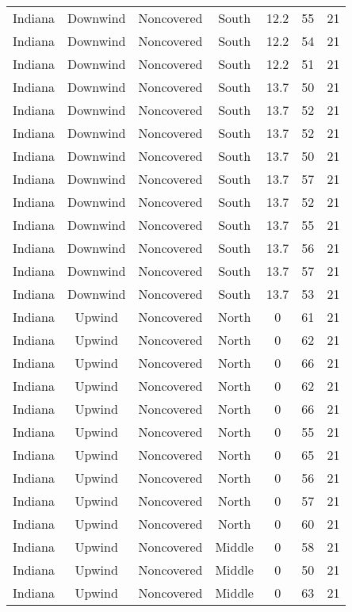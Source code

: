\documentclass{article}
\begin{document}
\begin{longtable}[H]{ccccccc}
Indiana & Downwind & Noncovered & South  & 12.2 & 55 & 21 \\
Indiana & Downwind & Noncovered & South  & 12.2 & 54 & 21 \\
Indiana & Downwind & Noncovered & South  & 12.2 & 51 & 21 \\
Indiana & Downwind & Noncovered & South  & 13.7 & 50 & 21 \\
Indiana & Downwind & Noncovered & South  & 13.7 & 52 & 21 \\
Indiana & Downwind & Noncovered & South  & 13.7 & 52 & 21 \\
Indiana & Downwind & Noncovered & South  & 13.7 & 50 & 21 \\
Indiana & Downwind & Noncovered & South  & 13.7 & 57 & 21 \\
Indiana & Downwind & Noncovered & South  & 13.7 & 52 & 21 \\
Indiana & Downwind & Noncovered & South  & 13.7 & 55 & 21 \\
Indiana & Downwind & Noncovered & South  & 13.7 & 56 & 21 \\
Indiana & Downwind & Noncovered & South  & 13.7 & 57 & 21 \\
Indiana & Downwind & Noncovered & South  & 13.7 & 53 & 21 \\
Indiana & Upwind   & Noncovered & North  & 0    & 61 & 21 \\
Indiana & Upwind   & Noncovered & North  & 0    & 62 & 21 \\
Indiana & Upwind   & Noncovered & North  & 0    & 66 & 21 \\
Indiana & Upwind   & Noncovered & North  & 0    & 62 & 21 \\
Indiana & Upwind   & Noncovered & North  & 0    & 66 & 21 \\
Indiana & Upwind   & Noncovered & North  & 0    & 55 & 21 \\
Indiana & Upwind   & Noncovered & North  & 0    & 65 & 21 \\
Indiana & Upwind   & Noncovered & North  & 0    & 56 & 21 \\
Indiana & Upwind   & Noncovered & North  & 0    & 57 & 21 \\
Indiana & Upwind   & Noncovered & North  & 0    & 60 & 21 \\
Indiana & Upwind   & Noncovered & Middle & 0    & 58 & 21 \\
Indiana & Upwind   & Noncovered & Middle & 0    & 50 & 21 \\
Indiana & Upwind   & Noncovered & Middle & 0    & 63 & 21 \\

\end{longtable}
\end{document}
